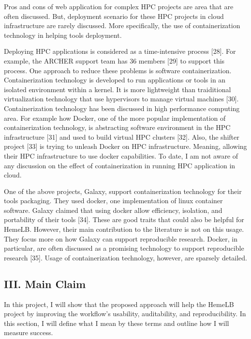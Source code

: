 \documentclass[]{article}
\begin{document}
Pros and cons of web application for complex HPC projects are area that
are often discussed. But, deployment scenario for these HPC projects in
cloud infrastructure are rarely discussed. More specifically, the use of
containerization technology in helping tools deployment.

Deploying HPC applications is considered as a time-intensive process
{[}28{]}. For example, the ARCHER support team has 36 members {[}29{]}
to support this process. One approach to reduce these problems is
software containerization. Containerization technology is developed to
run applications or tools in an isolated environment within a kernel. It
is more lightweight than traiditional virtualization technology that use
hypervisors to manage virtual machines {[}30{]}. Containerization
technology has been discussed in high performance computing area. For
example how Docker, one of the more popular implementation of
containerization technology, is abstracting software environment in the
HPC infrastructure {[}31{]} and used to build virtual HPC clusters
{[}32{]}. Also, the shifter project {[}33{]} is trying to unleash Docker
on HPC infrastructure. Meaning, allowing their HPC infrastructure to use
docker capabilities. To date, I am not aware of any discussion on the
effect of containerization in running HPC application in cloud.

One of the above projects, Galaxy, support containerization technology
for their tools packaging. They used docker, one implementation of linux
container software. Galaxy claimed that using docker allow efficiency,
isolation, and portability of their tools {[}34{]}. These are good
traits that could also be helpful for HemeLB. However, their main
contribution to the literature is not on this usage. They focus more on
how Galaxy can support reproducible research. Docker, in particular, are
often discussed as a promising technology to support reproducible
research {[}35{]}. Usage of containerization technology, however, are
sparsely detailed.

\subsection{III. Main Claim}\label{iii.-main-claim}

In this project, I will show that the proposed approach will help the
HemeLB project by improving the workflow's usability, auditability, and
reproducibility. In this section, I will define what I mean by these
terms and outline how I will measure success.
\end{document}
